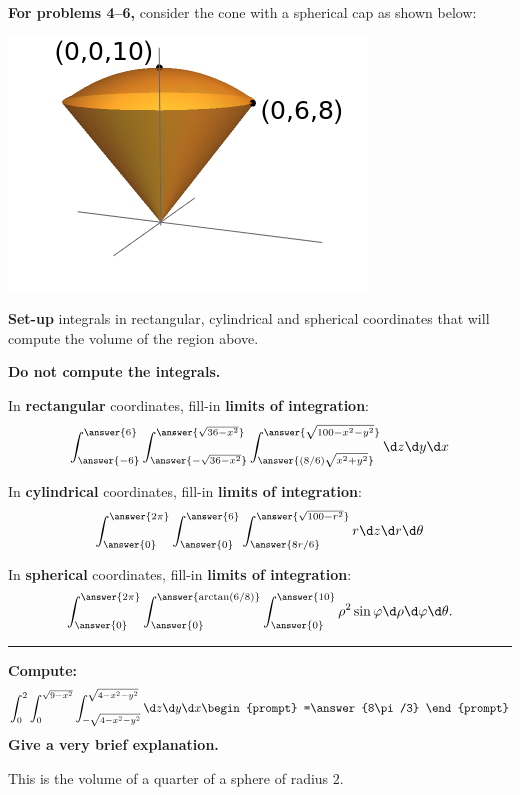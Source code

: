 \documentclass{ximera}
\begin{document}
\textbf{For problems 4--6,} consider the cone with a spherical cap
as shown below:
\begin{image}
  \includegraphics{coneWithCap6-8-10.png}
\end{image}

\textbf{Set-up} integrals in rectangular, cylindrical and spherical
coordinates that will compute the volume of the region above.

\textbf{Do not compute the integrals.}
\vfill

\begin{problem}
  In \textbf{rectangular} coordinates, fill-in \textbf{limits of integration}:
  \[
  \int_{\answer{-6}}^{\answer{6}}
  \int_{\answer{-\sqrt{36-x^2}}}^{\answer{\sqrt{36-x^2}}}
  \int_{\answer{(8/6)\sqrt{x^2+y^2}}}^{\answer{\sqrt{100-x^2-y^2}}}
  \d z \d y \d x
  \]
\end{problem}

\vfill

\begin{problem}
  In \textbf{cylindrical} coordinates, fill-in \textbf{limits of integration}:
  \[
  \int_{\answer{0}}^{\answer{2\pi}}
  \int_{\answer{0}}^{\answer{6}}
  \int_{\answer{8r/6}}^{\answer{\sqrt{100-r^2}}}
  r \d z \d r \d \theta
  \]
\end{problem}


\vfill

\begin{problem}
  In \textbf{spherical} coordinates, fill-in \textbf{limits of integration}:
  \[
  \int_{\answer{0}}^{\answer{2\pi}}
  \int_{\answer{0}}^{\answer{\arctan(6/8)}}
  \int_{\answer{0}}^{\answer{10}}
  \rho^2 \sin \varphi \d \rho \d \varphi \d\theta.
  \]
\end{problem}

\vfill

\hrule

\begin{problem}
  \textbf{Compute:}
  \[
  \int_{0}^{2} \int_{0}^{\sqrt{9-x^2}}\int_{-\sqrt{4-x^2-y^2}}^{\sqrt{4-x^2-y^2}} \d z\d y \d x
  \begin{prompt}
  =\answer{8\pi/3}  
  \end{prompt}
  \]
  \textbf{Give a very brief explanation.}
  \begin{feedback}[correct]
    This is the volume of a quarter of a sphere of radius $2$.
  \end{feedback}
  \vfill
\end{problem}
\end{document}
